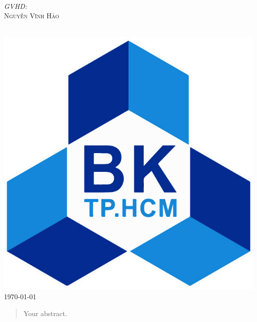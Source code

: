 \documentclass[a4paper, 12pt]{article}
\begin{document}
\begin{titlepage}
\begin{minipage}{0.4\textwidth}
\begin{flushleft}
\end{flushleft}
\end{minipage}
~
\begin{minipage}{0.4\textwidth}
\begin{flushright} \large
\emph{GVHD:} \\
\textsc{Nguyễn Vĩnh Hảo} %
\end{flushright}
\end{minipage}\\[1cm]


\includegraphics[scale=0.25]{images/LogoBK.jpg}\\[1cm] %

{\large \today}\\[0cm] %

\vfill %
\end{titlepage}

\tableofcontents
\begin{abstract}
Your abstract.
\end{abstract}
\end{document}

